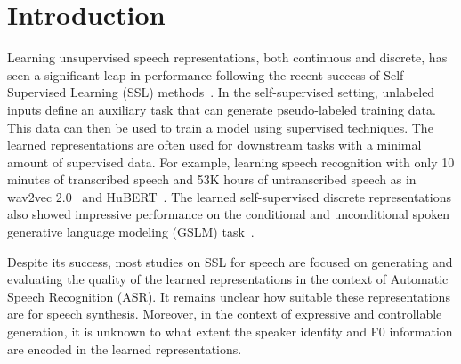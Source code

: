 
\vspace{-0.1cm}
\section{Introduction}
\vspace{-0.1cm}
Learning unsupervised speech representations, both continuous and discrete, has seen a significant leap in performance following the recent success of Self-Supervised Learning (SSL) methods~\cite{oord2018representation, schneider2019wav2vec, baevski2020wav2vec, hsu2020hubert}. In the self-supervised setting, unlabeled inputs define an auxiliary task that can generate pseudo-labeled training data. This data can then be used to train a model using supervised techniques. %
The learned representations are often used for downstream tasks with a minimal amount of supervised data. For example, learning  speech recognition with only 10 minutes of transcribed speech and 53K hours of untranscribed speech as in wav2vec 2.0~\cite{baevski2020wav2vec} and HuBERT~\cite{hsu2020hubert}. The learned self-supervised discrete representations also showed impressive performance on the conditional and unconditional spoken generative language modeling (GSLM) task~\cite{lakhotia2021generative}.

Despite its success, most studies on SSL for speech are focused on generating and evaluating the quality of the learned representations in the context of Automatic Speech Recognition (ASR). It remains unclear how suitable these representations are for speech synthesis. Moreover, in the context of expressive and controllable generation, it is unknown to what extent the speaker identity and F0 information are encoded in the learned representations. 

